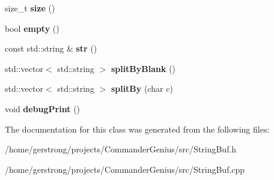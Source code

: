 \begin{DoxyCompactItemize}
\item 
\hypertarget{class_string_buf_af61df8b120d45ad6bed46ea3cb9f94c4}{
size\_\-t {\bfseries size} ()}
\label{class_string_buf_af61df8b120d45ad6bed46ea3cb9f94c4}

\item 
\hypertarget{class_string_buf_acea00111fc1acf6a3b801ce77508d54a}{
bool {\bfseries empty} ()}
\label{class_string_buf_acea00111fc1acf6a3b801ce77508d54a}

\item 
\hypertarget{class_string_buf_a839affd5fa3f857626f603b3d2c45146}{
const std::string \& {\bfseries str} ()}
\label{class_string_buf_a839affd5fa3f857626f603b3d2c45146}

\item 
\hypertarget{class_string_buf_a6f2e7bb602770c23a5c2e3bfd5d9f7a2}{
std::vector$<$ std::string $>$ {\bfseries splitByBlank} ()}
\label{class_string_buf_a6f2e7bb602770c23a5c2e3bfd5d9f7a2}

\item 
\hypertarget{class_string_buf_a53724334e4a18fb9b77493b4ed49d1e2}{
std::vector$<$ std::string $>$ {\bfseries splitBy} (char c)}
\label{class_string_buf_a53724334e4a18fb9b77493b4ed49d1e2}

\item 
\hypertarget{class_string_buf_a4500936cf434231a668c6dd622bb0e6c}{
void {\bfseries debugPrint} ()}
\label{class_string_buf_a4500936cf434231a668c6dd622bb0e6c}

\end{DoxyCompactItemize}


The documentation for this class was generated from the following files:\begin{DoxyCompactItemize}
\item 
/home/gerstrong/projects/CommanderGenius/src/StringBuf.h\item 
/home/gerstrong/projects/CommanderGenius/src/StringBuf.cpp\end{DoxyCompactItemize}
